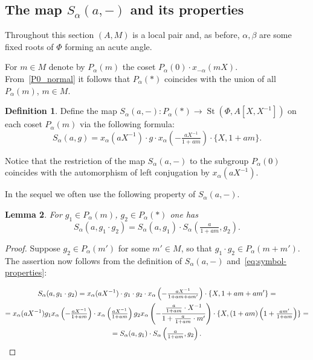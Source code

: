 \documentclass[oneside, 8pt]{amsart}
\newtheorem{lemma}{Lemma}
\theoremstyle{remark}
\theoremstyle{definition}
\numberwithin{lemma}{section}
\numberwithin{prop}{section}
\numberwithin{corollary}{section}
\numberwithin{externaltheorem}{section}
\newtheorem{df}[lemma]{Definition} \Crefname{df}{Definition}{Definitions}
\DeclareMathOperator{\St}{St}
\numberwithin{equation}{section}
\begin{document}
\subsection{The map \texorpdfstring{$S_\alpha(a, -)$}{S(a,-)} and its properties} \label{sec:S-a}
Throughout this section $(A, M)$ is a local pair and, as before, $\alpha, \beta$ are some fixed roots of $\Phi$ forming an acute angle.

For $m \in M$ denote by $P_\alpha(m)$ the coset $P_\alpha(0) \cdot x_{-\alpha}(mX)$.
From~\cref{P0_normal} it follows that $P_\alpha(*)$ coincides with the union of all $P_\alpha(m)$, $m\in M$. 
\begin{df}\label{S-def}
Define the map $S_\alpha(a, -) \colon P_\alpha(*) \to \St(\Phi, A[X, X^{-1}])$ on each coset $P_\alpha(m)$ via the following formula:
\begin{equation}\label{eq:S-def} S_\alpha(a, g) = x_\alpha(aX^{-1})\cdot g \cdot x_\alpha\left(-\tfrac{aX^{-1}}{1 + am}\right) \cdot \{X, 1+ am\}.\end{equation} \end{df}
Notice that the restriction of the map $S_\alpha(a, -)$ to the subgroup $P_\alpha(0)$ coincides with the automorphism of left conjugation by $x_\alpha(aX^{-1})$.

In the sequel we often use the following property of $S_\alpha(a, -)$.
\begin{lemma} \label{lem:Smult}
For $g_1 \in P_\alpha(m)$, $g_2 \in P_\alpha(*)$ one has
\[S_\alpha(a, g_1\cdot g_2) = S_\alpha(a, g_1) \cdot S_\alpha\left(\tfrac{a}{1+am}, g_2\right).\]
\end{lemma} \begin{proof} Suppose $g_2\in P_\alpha(m')$ for some $m' \in M$, so that $g_1 \cdot g_2 \in P_\alpha(m + m')$. The assertion now follows from the definition of $S_\alpha(a, -)$ and~\eqref{eq:symbol-properties}:

\begin{multline*} S_\alpha(a, g_1 \cdot g_2) = x_\alpha(aX^{-1}) \cdot g_1 \cdot g_2 \cdot x_\alpha\left(-\tfrac{aX^{-1}}{1+am+am'}\right) \cdot \{X, 1 + am + am'\} = \\ = x_\alpha(aX^{-1}) g_1 x_\alpha\left(-\tfrac{aX^{-1}}{1+am}\right) \cdot x_\alpha\left(\tfrac{aX^{-1}}{1+am}\right) g_2 x_\alpha\left(-\frac{\tfrac{a}{1+am}\cdot X^{-1}}{1 + \tfrac{a}{1+am}\cdot m'}\right) \cdot \{X, (1+am)\left(1 + \tfrac{am'}{1+am}\right)\} = \\ = S_\alpha(a, g_1) \cdot S_\alpha\left(\tfrac{a}{1+am}, g_2\right). \qedhere \end{multline*}
\end{proof}
\end{document}
